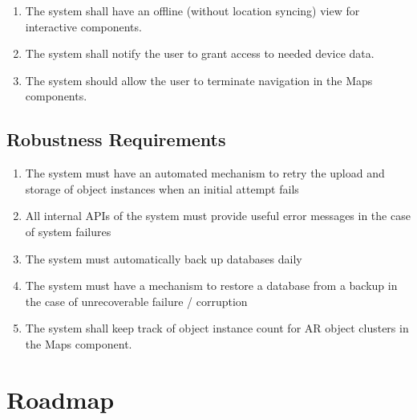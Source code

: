 \documentclass{article}
\begin{document}
\begin{enumerate}[label=\textbf{ACR-\arabic*},ref=ACR-\arabic*]
    \item \label{ACR-1} The system shall have an offline (without location syncing) view for interactive components. \\
    \item \label{ACR-2} The system shall notify the user to grant access to needed device data. \\
    \item \label{ACR-3} The system should allow the user to terminate navigation in the Maps components. \\
\end{enumerate}

\subsection{Robustness Requirements}

\begin{enumerate}[label=\textbf{ROR-\arabic*},ref=ROR-\arabic*]
    \item \label{ROR-1} The system must have an automated mechanism to retry the upload and storage of object instances when an initial attempt fails \\
    \item \label{ROR-2} All internal APIs of the system must provide useful error messages in the case of system failures \\
    \item \label{ROR-3} The system must automatically back up databases daily \\
    \item \label{ROR-4} The system must have a mechanism to restore a database from a backup in the case of unrecoverable failure / corruption \\
    \item \label{ROR-1} The system shall keep track of object instance count for AR object clusters in the Maps component. \\
\end{enumerate}

\section{Roadmap}

\end{document}
